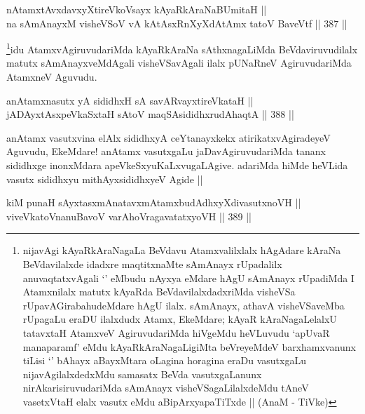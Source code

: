 
\begin{shl}
nA\s \s tamxtAvxdavxyXtireVkoV\s sayx kAyaRkAraNaBUmitaH || \\
na sAmAnayxM visheVSoV vA kAtAsxRnXyXdAtAmx tatoV BaveVtf ||  387 ||  
\end{shl}

\begin{artha}
\footnote{nijavAgi kAyaRkAraNagaLa BeVdavu Atamxvalilxlalx hAgAdare kAraNa BeVdavilalxde idadxre maqtitxnaMte sAmAnayx rUpadalilx anuvaqtatxvAgali `\stext' eMbudu nAyxya eMdare hAgU sAmAnayx rUpadiMda I Atamxnilalx matutx kAyaRda BeVdavilalxdadxriMda visheVSa rUpavAGirabahudeMdare hAgU ilalx. sAmAnayx, athavA visheVSaveMba rUpagaLu eraDU ilalxdudx Atamx, EkeMdare; kAyaR kAraNagaLelalxU tatavxtaH AtamxveV AgiruvudariMda hiVgeMdu heVLuvudu `apUvaR manaparamf' eMdu kAyaRkAraNagaLigiMta beVreyeMdeV barxhamxvanunx tiLisi `\stext' bAhayx aBayxMtara oLagina horagina eraDu vasutxgaLu nijavAgilalxdedxMdu samasatx BeVda vasutxgaLanunx nirAkarisiruvudariMda sAmAnayx visheVSagaLilalxdeMdu tAneV vasetxVtaH elalx vasutx eMdu aBipArxyapaTiTxde || (AnaM - TiVke)}idu AtamxvAgiruvudariMda kAyaRkAraNa sAthxnagaLiMda BeVdaviruvudilalx matutx sAmAnayxveMdAgali visheVSavAgali ilalx pUNaRneV AgiruvudariMda AtamxneV Aguvudu.
\end{artha}


\begin{shl}
anAtamxnasutx yA sididhxH sA savAR\s vayxtireVkataH || \\
jADAyxtAsxpeVkaSxtaH sA\s toV maqSAsididhxrudAhaqtA ||  388 ||  
\end{shl}

\begin{artha}
anAtamx vasutxvina elAlx sididhxyA ceYtanayxkekx atirikatxvAgiradeyeV Aguvudu, EkeMdare! anAtamx vasutxgaLu jaDavAgiruvudariMda tananx sididhxge inonxMdara apeVkeSxyuKaLxvugaLAgive. adariMda hiMde heVLida vasutx sididhxyu mithAyxsididhxyeV Agide ||
\end{artha}


\begin{shl}
kiM punaH sAyxtasxmAnatavxmAtamxbudAdhxyXdivasutxnoVH || \\
viveVkatoV\s nanuBavoV varAhoVragavatatxyoVH ||  389 ||  
\end{shl}

